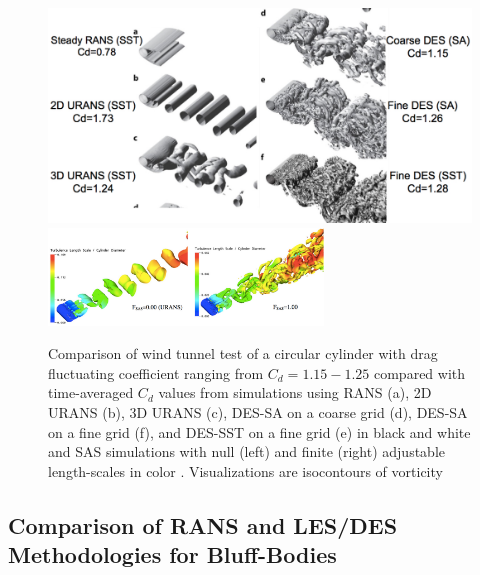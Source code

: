 \documentclass[journal]{new-aiaa}
\begin{document}
\begin{figure}[H]
\begin{center}
\includegraphics[width=1.0\textwidth]{Images/logan/spalart2009detachededdy_cylindersCD.pdf}
\includegraphics[width=0.65\textwidth]{Images/logan/menter2005scaleadaptive_cylinderwake.pdf}
\caption{ Comparison of wind tunnel test of a circular cylinder with drag fluctuating coefficient ranging from $C_d=1.15-1.25$ compared with time-averaged $C_d$ values from simulations using RANS (a), 2D URANS (b), 3D URANS (c), DES-SA on a coarse grid (d), DES-SA on a fine grid (f), and DES-SST on a fine grid (e) \cite{spalart2009detachededdy} in black and white and SAS simulations with null (left) and finite (right) adjustable length-scales in color \cite{menter2005scaleadaptive}. Visualizations are isocontours of vorticity }
\label{fig:cylinderturbmodels}
\end{center}
\end{figure}










\subsection{Comparison of RANS and LES/DES Methodologies for Bluff-Bodies} \label{subsec:desvsrans}
\end{document}
